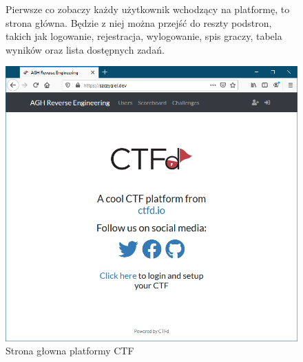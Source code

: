 \documentclass[polish,12pt]{aghthesis}
\begin{document}
\begin{figure}[ht]
    Pierwsze co zobaczy każdy użytkownik wchodzący na platformę, to strona główna.
    Będzie z niej można przejść do reszty podstron, takich jak logowanie, rejestracja,
    wylogowanie, spis graczy, tabela wyników oraz lista dostępnych zadań.

    \vspace{1cm}

    \centering
    \includegraphics[width=14cm]{szczygiel_dev}
    \caption{Strona głowna platformy CTF}
    \label{fig:szczygiel_dev}
\end{figure}
\end{document}

